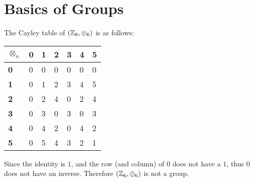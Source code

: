 \section{Basics of Groups}
\begin{questions}
    \item The Cayley table of $(\mathbb{Z}_6, \otimes_6)$ is as follows:
    \begin{table}[H]
        \centering
        \begin{tabular}{|l|l|l|l|l|l|l|}
        \hline
        \textbf{$\otimes_n$} & \textbf{0} & \textbf{1} & \textbf{2} & \textbf{3} & \textbf{4} & \textbf{5} \\ \hline
        \textbf{0}       & 0          & 0          & 0          & 0          & 0          & 0          \\ \hline
        \textbf{1}       & 0          & 1          & 2          & 3          & 4          & 5          \\ \hline
        \textbf{2}       & 0          & 2          & 4          & 0          & 2          & 4          \\ \hline
        \textbf{3}       & 0          & 3          & 0          & 3          & 0          & 3          \\ \hline
        \textbf{4}       & 0          & 4          & 2          & 0          & 4          & 2          \\ \hline
        \textbf{5}       & 0          & 5          & 4          & 3          & 2          & 1          \\ \hline
        \end{tabular}
    \end{table}

    Since the identity is $1$, and the row (and column) of 0 does not have a $1$, thus $0$ does not have an inverse. Therefore $(\mathbb{Z}_6, \oplus_6)$ is not a group.
    

\end{questions}
